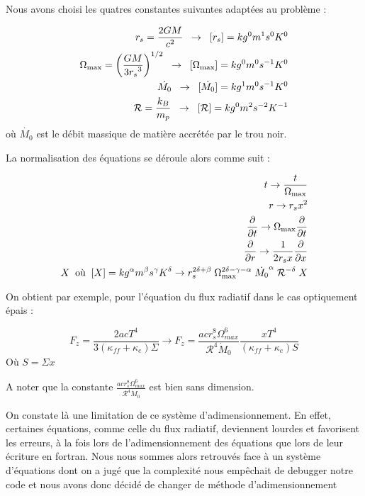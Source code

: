 \documentclass[a4paper,12pt]{article}
\begin{document}
Nous avons choisi les quatres constantes suivantes adaptées au problème :

	\begin{align}
		r_s=\frac{2GM}{c^2}\;\;\rightarrow\;\;[r_s]=kg^{0}m^{1}s^{0}K^{0}\\
		\Omega_{\rm{max}}=\left ( \frac{GM}{{3r_s}^3} \right)^{1/2}\;\;\rightarrow\;\;[\Omega_{\rm{max}}]=kg^{0}m^{0}s^{-1}K^{0}\\
		\dot{M_0}\;\;\rightarrow\;\;[\dot{M_0}]=kg^{1}m^{0}s^{-1}K^{0}\\
		\mathcal{R}=\frac{k_B}{m_p}\;\;\rightarrow\;\;[\mathcal{R}]=kg^{0}m^{2}s^{-2}K^{-1}
	\end{align}
où $\dot{M_0}$ est le débit massique de matière accrétée par le trou noir.

La normalisation des équations se déroule alors comme suit :

	\begin{align}
		t \rightarrow \frac{t}{\Omega_{\rm{max}}}\\
		r \rightarrow r_sx^2\\
		\frac{\partial}{\partial t} \rightarrow \Omega_{\rm{max}}\frac{\partial}{\partial t}\\
		\frac{\partial}{\partial r} \rightarrow \frac{1}{2r_sx}\frac{\partial}{\partial x}\\
		X\;\;\textrm{où}\;\;[X]=kg^{\alpha}m^{\beta}s^{\gamma}K^{\delta} \rightarrow r_s^{2\delta+\beta}\;\Omega_{\rm{max}}^{2\delta-\gamma-\alpha}\;\dot{M_0}^{\alpha}\;\mathcal{R}^{-\delta}\;X
	\end{align}

On obtient par exemple, pour l'équation du flux radiatif dans le cas optiquement épais : 

	\begin{equation}
		F_z=\frac{2acT^4}{3(\kappa_{ff}+\kappa_e)\Sigma}\rightarrow F_z=\frac{acr_s^8\Omega_{max}^6}{\mathcal{R}^4\dot{M}_0}\frac{xT^4}{(\kappa_{ff}+\kappa_e)S}
	\end{equation}
Où $S=\Sigma x$

A noter que la constante $\frac{acr_s^8\Omega_{max}^6}{\mathcal{R}^4\dot{M}_0}$ est bien sans dimension.

On constate là une limitation de ce système d'adimensionnement. En effet, certaines équations, comme celle du flux radiatif, deviennent lourdes et favorisent les erreurs, à la fois lors de l'adimensionnement des équations que lors de leur écriture en fortran. Nous nous sommes alors retrouvés face à un système d'équations dont on a jugé que la complexité nous empêchait de debugger notre code et nous avons donc décidé de changer de méthode d'adimensionnement
\end{document}
